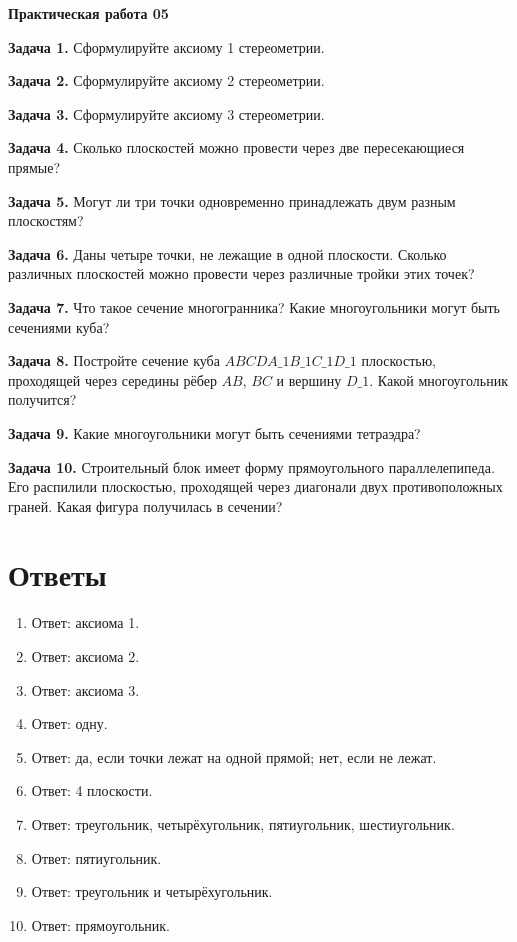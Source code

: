 \documentclass{umk-matematika}
\begin{document}
\begin{center}
{\Large\bfseries Практическая работа 05}
\end{center}
\vspace{0.5cm}

\textbf{Задача 1.} Сформулируйте аксиому 1 стереометрии.\par\vspace{10pt}
\textbf{Задача 2.} Сформулируйте аксиому 2 стереометрии.\par\vspace{10pt}
\textbf{Задача 3.} Сформулируйте аксиому 3 стереометрии.\par\vspace{10pt}
\textbf{Задача 4.} Сколько плоскостей можно провести через две пересекающиеся прямые?\par\vspace{10pt}
\textbf{Задача 5.} Могут ли три точки одновременно принадлежать двум разным плоскостям?\par\vspace{10pt}
\textbf{Задача 6.} Даны четыре точки, не лежащие в одной плоскости. Сколько различных плоскостей можно провести через различные тройки этих точек?\par\vspace{10pt}
\textbf{Задача 7.} Что такое сечение многогранника? Какие многоугольники могут быть сечениями куба?\par\vspace{10pt}
\textbf{Задача 8.} Постройте сечение куба $ABCDA\_1B\_1C\_1D\_1$ плоскостью, проходящей через середины рёбер $AB$, $BC$ и вершину $D\_1$. Какой многоугольник получится?\par\vspace{10pt}
\textbf{Задача 9.} Какие многоугольники могут быть сечениями тетраэдра?\par\vspace{10pt}
\textbf{Задача 10.} Строительный блок имеет форму прямоугольного параллелепипеда. Его распилили плоскостью, проходящей через диагонали двух противоположных граней. Какая фигура получилась в сечении?\par\vspace{10pt}
\newpage
\section*{Ответы}

\begin{enumerate}
  \item Ответ: аксиома 1.
  \item Ответ: аксиома 2.
  \item Ответ: аксиома 3.
  \item Ответ: одну.
  \item Ответ: да, если точки лежат на одной прямой; нет, если не лежат.
  \item Ответ: 4 плоскости.
  \item Ответ: треугольник, четырёхугольник, пятиугольник, шестиугольник.
  \item Ответ: пятиугольник.
  \item Ответ: треугольник и четырёхугольник.
  \item Ответ: прямоугольник.
\end{enumerate}
\end{document}
